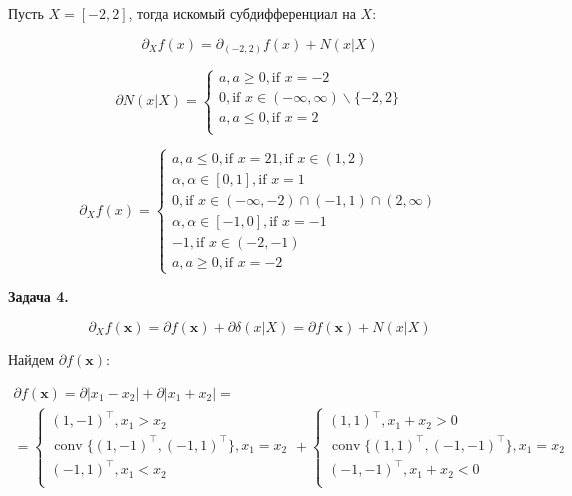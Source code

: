 \documentclass[12pt]{article}
\DeclareMathOperator*{\conv}{conv}
\begin{document}
Пусть $X = [-2, 2]$, тогда искомый субдифференциал на $X$:

\begin{equation}
\partial_X f(x) = \partial_{(-2, 2)}f(x) + N(x|X)
\end{equation}

\begin{equation}
\partial N(x|X) =
\begin{cases}
a, a\geq 0, \text{if $x = -2$}\\
0, \text{if $x \in (-\infty, \infty)\backslash \{-2, 2\}$}\\
a, a\leq 0, \text{if $x = 2$}\\
\end{cases}
\end{equation}


\begin{equation}
\boxed{
\partial_X f(x) = 
\begin{cases}
a, a\leq 0, \text{if $x = 2$}
1, \text{if $x \in (1, 2)$}\\
\alpha, \alpha \in[0, 1], \text{if $x = 1$}\\
0, \text{if $x \in (-\infty, -2)\cap(-1, 1)\cap(2,\infty)$}\\
\alpha, \alpha \in[-1, 0], \text{if $x = -1$}\\
-1, \text{if $x \in (-2, -1)$}\\
a, a\geq 0, \text{if $x = -2$}
\end{cases}}
\end{equation}


\begin{center}
	\textbf{Задача 4.}
\end{center}

\begin{equation}
\partial_X f(\textbf{x}) = \partial f(\textbf{x}) + \partial \delta(x|X)= \partial f(\textbf{x}) + N(x|X) 
\end{equation}

Найдем $\partial f(\textbf{x})$:

\begin{eqnarray}
\partial f(\textbf{x}) = \partial |x_1-x_2| + \partial |x_1+x_2| = \nonumber\\
= \begin{cases}
(1, -1)^{\top}, \text{$x_1>x_2$}\\
\conv\{(1, -1)^{\top}, (-1, 1)^{\top}\}, \text{$x_1=x_2$}\\
(-1, 1)^{\top}, \text{$x_1<x_2$}\\
\end{cases} + 
\begin{cases}
(1, 1)^{\top}, \text{$x_1 +x_2>0$}\\
\conv\{(1, 1)^{\top}, (-1, -1)^{\top}\}, \text{$x_1=x_2$}\\
(-1, -1)^{\top}, \text{$x_1+x_2<0$}\\
\end{cases}
\end{eqnarray}
\end{document}
